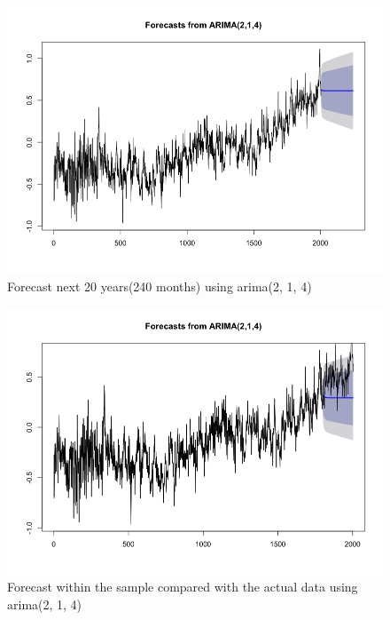 \documentclass[a4paper,10pt]{article}
\begin{document}
\begin{figure}[H]
\centering
\caption{Forecast next 20 years(240 months) using arima(2, 1, 4)}
\includegraphics[scale=.5]{arima_forecast.png}
\end{figure}

\begin{figure}[H]
\centering
\caption{Forecast within the sample compared with the actual data using arima(2, 1, 4)}
\includegraphics[scale=.5]{arima_sample.png}
\end{figure}
\end{document}
